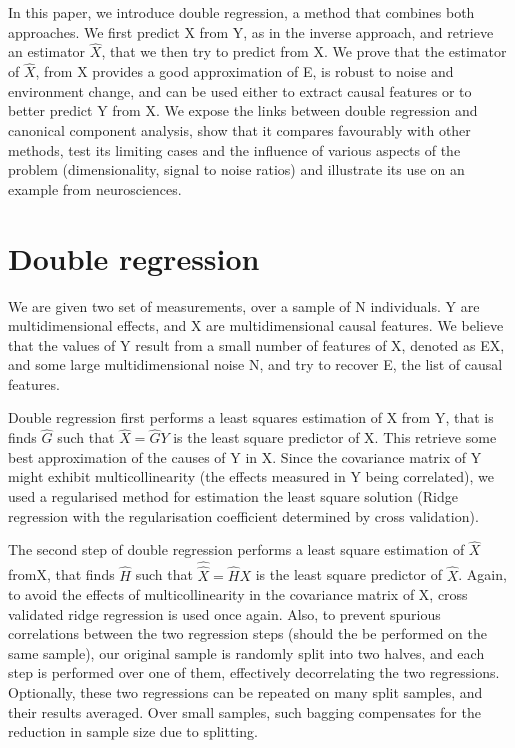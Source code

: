 \documentclass{article}
\begin{document}
In this paper, we introduce double regression, a method that combines both approaches. We first predict X from Y, as in the inverse approach, and retrieve an estimator $\hat X$, that we then try to predict from X. We prove that the estimator of $\hat X$, from X provides a good approximation of E, is robust to noise and environment change, and can be used either to extract causal features or to better predict Y from X. We expose the links between double regression and canonical component analysis, show that it compares favourably with other methods, test its limiting cases and the influence of various aspects of the problem (dimensionality, signal to noise ratios) and illustrate its use on an example from neurosciences. 

\section{Double regression}
We are given two set of measurements, over a sample of N individuals. Y are multidimensional effects, and X are multidimensional causal features. We believe that the values of Y result from a small number of features of X, denoted as EX, and some large multidimensional noise N, and try to recover E, the list of causal features. 

Double regression first performs a least squares estimation of X from Y, that is finds $\hat G$ such that $\hat X=\hat G Y$ is the least square predictor of X. This retrieve some best approximation of the causes of Y in X. Since the covariance matrix of Y might exhibit multicollinearity (the effects measured in Y being correlated), we used a regularised method for estimation the least square solution (Ridge regression with the regularisation coefficient determined by cross validation).

The second step of double regression performs a least square estimation of $\hat X$ fromX, that finds $\hat H$ such that $\hat \hat X=\hat H X$ is the least square predictor of $\hat X$. Again, to avoid the effects of multicollinearity in the covariance matrix of X, cross validated ridge regression is used once again. Also, to prevent spurious correlations between the two regression steps (should the be performed on the same sample), our original sample is randomly split into two halves, and each step is performed over one of them, effectively decorrelating the two regressions. Optionally, these two regressions can be repeated on many split samples, and their results averaged. Over small samples, such bagging compensates for the reduction in sample size due to splitting.  
\end{document}
